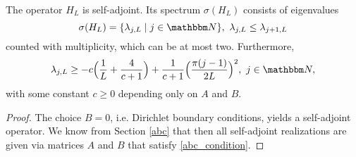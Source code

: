 \begin{lemma}\label{H_L_spectrum}
The operator $H_L$ is self-adjoint. Its spectrum $\sigma(H_L)$ consists of eigenvalues
\begin{equation}\label{H_L_spectrum01}
  \sigma(H_L) = \{ \lambda_{j,L} \mid j\in\N\},\ \lambda_{j,L} \leq \lambda_{j+1,L}
\end{equation}
counted with multiplicity, which can be at most two. Furthermore,
\begin{equation}\label{H_L_spectrum02}
  \lambda_{j,L} \geq -c\Big(\frac{1}{L} + \frac{4}{c+1}\Big) + \frac{1}{c+1}\Big(\frac{\pi(j-1)}{2L}\Big)^2,\ j\in\N,
\end{equation}
with some constant $c\geq 0$ depending only on $A$ and $B$.
\end{lemma}
\begin{proof}
The choice $B=0$, i.e. Dirichlet boundary conditions, yields a self-adjoint operator.
We know from Section \ref{abc} that then all self-adjoint realizations are given via matrices $A$ and $B$ that
satisfy \eqref{abc_condition}.


\end{proof}
